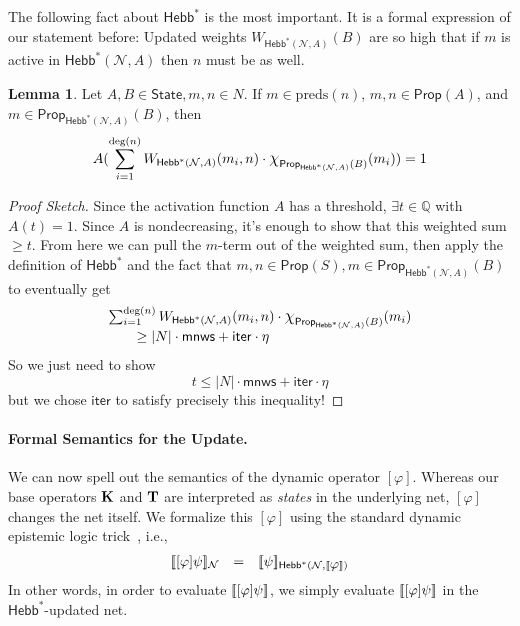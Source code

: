 \documentclass[letterpaper]{article}
\theoremstyle{definition}
\newtheorem{lemma}[theorem]{Lemma}
\newenvironment{sketch}{\begin{proof}[Proof Sketch]}{\end{proof}}
\newcommand{\Rat}{\mathbb{Q}}
\newcommand{\State}{\mathsf{State}}
\newcommand{\semantics}[1]{[\![\mbox{\em $ #1 $\/}]\!]}
\newcommand*{\bigchi}{\mbox{\Large$\chi$}}%
\newcommand{\degree}[1]{\mathrm{deg}(#1)}
\newcommand{\preds}[1]{\mbox{preds}(#1)}
\newcommand{\minscore}{\mathsf{mnws}}
\newcommand{\numiterations}{\mathsf{iter}}
\newcommand{\Net}{\mathcal{N}}
\newcommand{\Prop}{\mathsf{Prop}}
\newcommand{\Hebbstar}[2]{\mathsf{Hebb}^*(#1, #2)}
\newcommand{\HebbstarNoArgs}{\mathsf{Hebb}^*}
\newcommand{\KnowNoArgs}{\textrm{\textup{\textbf{K}}}}
\newcommand{\TypNoArgs}{\textrm{\textup{\textbf{T}}}}
\newcommand{\Hebbop}[1]{[#1]}
\begin{document}
The following fact about $\HebbstarNoArgs$ is the most important.  It is a formal expression of our statement before:  Updated weights $W_{\Hebbstar{\Net}{A}}(B)$ are so high that if $m$ is active in $\Hebbstar{\Net}{A}$ then $n$ must be as well.
\begin{lemma}\label{hebb_updated_by}
    Let $A, B \in \State, m, n \in N$. If $m \in \preds{n}$, $m, n \in \Prop(A)$, and $m \in \Prop_{\Hebbstar{\Net}{A}}(B)$, then
    \[
        A(\sum_{i=1}^{\degree{n}} W_{\Hebbstar{\Net}{A}}(m_i, n) \cdot \bigchi_{\Prop_{\Hebbstar{\Net}{A}}(B)}(m_i)) = 1
    \]
\end{lemma}
\begin{sketch}
    Since the activation function $A$ has a threshold, $\exists t \in \Rat$ with $A(t) = 1$. Since $A$ is nondecreasing, it's enough to show that this weighted sum $\geq t$.  From here we can pull the $m$-term out of the weighted sum, then apply the definition of $\HebbstarNoArgs$ and the fact that $m, n \in \Prop(S), m \in \Prop_{\Hebbstar{\Net}{A}}(B)$ to eventually get
    \[
    \begin{array}{l}
        \sum_{i=1}^{\degree{n}} W_{\Hebbstar{\Net}{A}}(m_i, n) \cdot \bigchi_{\Prop_{\Hebbstar{\Net}{A}}(B)}(m_i)\\
        
        \quad \quad \geq
        |N| \cdot \minscore + \numiterations \cdot \eta \\
    \end{array}
    \]
    So we just need to show
    \[
        t \leq |N| \cdot \minscore + \numiterations \cdot \eta
    \]
    but we chose $\numiterations$ to satisfy precisely this inequality!
\end{sketch}

\paragraph*{Formal Semantics for the Update.} We can now spell out the semantics of the dynamic operator $\Hebbop{\varphi}$.  Whereas our base operators $\KnowNoArgs$ and $\TypNoArgs$ are interpreted as \emph{states} in the underlying net, $\Hebbop{\varphi}$ changes the net itself.  We formalize this $\Hebbop{\varphi}$ using the standard dynamic epistemic logic trick~\cite{DELBook}, i.e.,
\[
\begin{array}{lcl}
    \semantics{\Hebbop{\varphi} \psi}_\Net & = & \semantics{\psi}_{\Hebbstar{\Net}{\semantics{\varphi}}}
\end{array}
\]
In other words, in order to evaluate $\semantics{\Hebbop{\varphi} \psi}$, we simply evaluate $\semantics{\Hebbop{\varphi} \psi}$ in the $\HebbstarNoArgs$-updated net.
\end{document}
